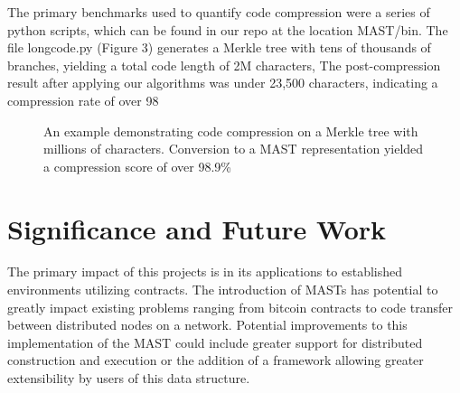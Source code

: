 \documentclass{vldb}
\begin{document}
The primary benchmarks used to quantify code compression were a series of python scripts, which can be found in our repo at the location MAST/bin. The file longcode.py (Figure 3) generates a Merkle tree with tens of thousands of branches, yielding a total code length of 2M characters, The post-compression result after applying our algorithms was under 23,500 characters, indicating a compression rate of over 98%

\begin{figure}[t!]
	
	\caption{An example demonstrating code compression on a Merkle tree with millions of characters. Conversion to a MAST representation yielded a compression score of over 98.9\%}
\end{figure}

\section{Significance and Future Work}

The primary impact of this projects is in its applications to established environments utilizing contracts. The introduction of MASTs has potential to greatly impact existing problems ranging from bitcoin contracts to code transfer between distributed nodes on a network. Potential improvements to this implementation of the MAST could include greater support for distributed construction and execution or the addition of a framework allowing greater extensibility by users of this data structure.



\end{document}

